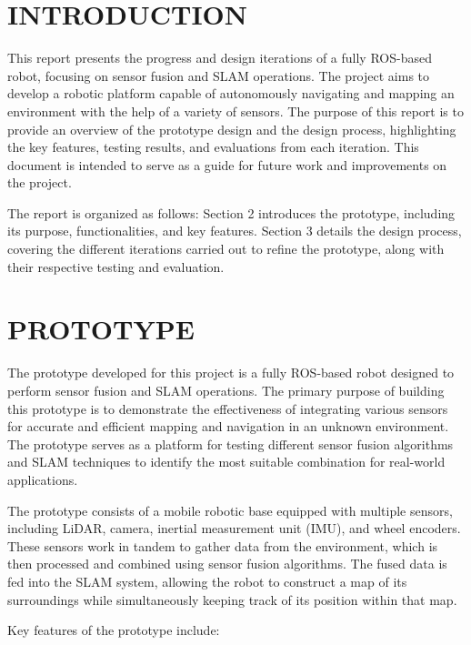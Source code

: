 \documentclass[12pt]{article}
\begin{document}
\section{INTRODUCTION}

This report presents the progress and design iterations of a fully ROS-based robot, focusing on sensor fusion and SLAM operations. The project aims to develop a robotic platform capable of autonomously navigating and mapping an environment with the help of a variety of sensors. The purpose of this report is to provide an overview of the prototype design and the design process, highlighting the key features, testing results, and evaluations from each iteration. This document is intended to serve as a guide for future work and improvements on the project.

The report is organized as follows: Section 2 introduces the prototype, including its purpose, functionalities, and key features. Section 3 details the design process, covering the different iterations carried out to refine the prototype, along with their respective testing and evaluation.

\section{PROTOTYPE}

The prototype developed for this project is a fully ROS-based robot designed to perform sensor fusion and SLAM operations. The primary purpose of building this prototype is to demonstrate the effectiveness of integrating various sensors for accurate and efficient mapping and navigation in an unknown environment. The prototype serves as a platform for testing different sensor fusion algorithms and SLAM techniques to identify the most suitable combination for real-world applications.

The prototype consists of a mobile robotic base equipped with multiple sensors, including LiDAR, camera, inertial measurement unit (IMU), and wheel encoders. These sensors work in tandem to gather data from the environment, which is then processed and combined using sensor fusion algorithms. The fused data is fed into the SLAM system, allowing the robot to construct a map of its surroundings while simultaneously keeping track of its position within that map.

Key features of the prototype include:
\end{document}
